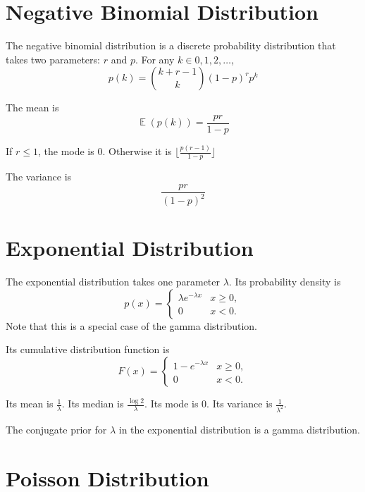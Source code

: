 \documentclass[12pt]{article}
\DeclareMathOperator*{\E}{\mathbb{E}}
\begin{document}
\section*{Negative Binomial Distribution}

The negative binomial distribution is a discrete probability distribution that takes two parameters: $r$ and $p$. For any $k \in 0, 1,2,\ldots$,
\begin{equation*}
p(k) = \binom{k+r-1}{k} (1-p)^r p^k 
\end{equation*}

The mean is
\begin{equation*}
\E \left( p(k) \right) = \frac{pr}{1-p}
\end{equation*}

If $r \leq 1$, the mode is 0. Otherwise it is $\lfloor \frac{p(r - 1)}{1 - p} \rfloor$

The variance is
\begin{equation*}
\frac{pr}{(1-p)^2}
\end{equation*}

\section*{Exponential Distribution}

The exponential distribution takes one parameter $\lambda$. Its probability density is
\begin{equation*}
p(x) = \begin{cases}
\lambda e^{-\lambda x} & x \ge 0, \\
0 & x < 0.
\end{cases}
\end{equation*}
Note that this is a special case of the gamma distribution.

Its cumulative distribution function is
\begin{equation*}
F(x) = \begin{cases}
1-e^{-\lambda x} & x \ge 0, \\
0 & x < 0.
\end{cases}
\end{equation*}

Its mean is $\frac{1}{\lambda}$. Its median is $\frac{\log{2}}{\lambda}$. Its mode is 0. Its variance is $\frac{1}{\lambda^2}$.

The conjugate prior for $\lambda$ in the exponential distribution is a gamma distribution.

\section*{Poisson Distribution}
\end{document}

